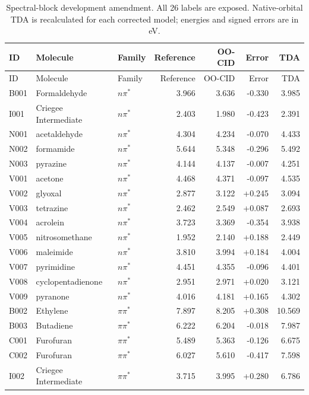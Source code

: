 {\small\setlength{\tabcolsep}{4pt}\begin{longtable}{lllrrrr}
\caption{Spectral-block development amendment. All 26 labels are exposed. Native-orbital TDA is recalculated for each corrected model; energies and signed errors are in eV.}\label{tab:spectralblocks}\\
\toprule ID & Molecule & Family & Reference & OO-CID & Error & TDA \\ \midrule\endfirsthead
\toprule ID & Molecule & Family & Reference & OO-CID & Error & TDA \\ \midrule\endhead
B001 & Formaldehyde & $n\pi^*$ & 3.966 & 3.636 & -0.330 & 3.985 \\
I001 & Criegee Intermediate & $n\pi^*$ & 2.403 & 1.980 & -0.423 & 2.391 \\
N001 & acetaldehyde & $n\pi^*$ & 4.304 & 4.234 & -0.070 & 4.433 \\
N002 & formamide & $n\pi^*$ & 5.644 & 5.348 & -0.296 & 5.492 \\
N003 & pyrazine & $n\pi^*$ & 4.144 & 4.137 & -0.007 & 4.251 \\
V001 & acetone & $n\pi^*$ & 4.468 & 4.371 & -0.097 & 4.535 \\
V002 & glyoxal & $n\pi^*$ & 2.877 & 3.122 & +0.245 & 3.094 \\
V003 & tetrazine & $n\pi^*$ & 2.462 & 2.549 & +0.087 & 2.693 \\
V004 & acrolein & $n\pi^*$ & 3.723 & 3.369 & -0.354 & 3.938 \\
V005 & nitrosomethane & $n\pi^*$ & 1.952 & 2.140 & +0.188 & 2.449 \\
V006 & maleimide & $n\pi^*$ & 3.810 & 3.994 & +0.184 & 4.004 \\
V007 & pyrimidine & $n\pi^*$ & 4.451 & 4.355 & -0.096 & 4.401 \\
V008 & cyclopentadienone & $n\pi^*$ & 2.951 & 2.971 & +0.020 & 3.121 \\
V009 & pyranone & $n\pi^*$ & 4.016 & 4.181 & +0.165 & 4.302 \\
B002 & Ethylene & $\pi\pi^*$ & 7.897 & 8.205 & +0.308 & 10.569 \\
B003 & Butadiene & $\pi\pi^*$ & 6.222 & 6.204 & -0.018 & 7.987 \\
C001 & Furofuran & $\pi\pi^*$ & 5.489 & 5.363 & -0.126 & 6.675 \\
C002 & Furofuran & $\pi\pi^*$ & 6.027 & 5.610 & -0.417 & 7.598 \\
I002 & Criegee Intermediate & $\pi\pi^*$ & 3.715 & 3.995 & +0.280 & 6.786 \\

\end{longtable}}
